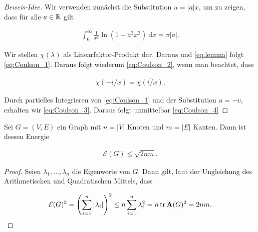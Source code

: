         \begin{proof}[Beweis-Idee]

            Wir verwenden zunächst die Substitution $u = |a| x$, um zu zeigen, dass für alle $a \in \mathbb R$ gilt

            \begin{align} \label{eq:lemma}
                \int_0^\infty
                    \frac{1}{x^2}
                    \ln(1 + a^2 x^2)
                    ~ \mathrm d x
                =
                \pi |a|.
            \end{align}

            Wir stellen $\chi(\lambda)$ als Linearfaktor-Produkt dar.
            Daraus und \eqref{eq:lemma} folgt \eqref{eq:Coulson_1}.
            Daraus folgt wiederum \eqref{eq:Coulson_2}, wenn man beachtet, dass

            \begin{align*}
                \chi(-i/x) = \overline{\chi(i/x)}.
            \end{align*}

            Durch partielles Integrieren von \eqref{eq:Coulson_1} und der Substitution $u = -v$, erhalten wir \eqref{eq:Coulson_3}.
            Daraus folgt unmittelbar \eqref{eq:Coulson_4}

        \end{proof}

        \begin{theorem}

            Sei $G = (V, E)$ ein Graph mit $n = |V|$ Knoten und $m = |E|$ Kanten.
            Dann ist dessen Energie

            \begin{align*}
                \mathcal E(G)
                \leq
                \sqrt{2 n m}.                
            \end{align*}

        \end{theorem}

        \begin{proof}

            Seien $\lambda_1, \dots, \lambda_n$ die Eigenwerte von $G$.
            Dann gilt, laut der Ungleichung des Arithmetischen und Quadratischen Mittels, dass

            \begin{align*}
                \mathcal E(G)^2
                =
                {\left ( 
                    \sum_{i=1}^n
                        |\lambda_i|
                 \right )}^2
                \leq
                n \sum_{i=1}^n \lambda_i^2
                =
                n \operatorname{tr} \mathbf A(G)^2
                =
                2 n m.                
            \end{align*}

        \end{proof}
